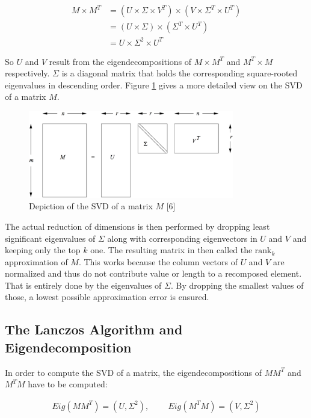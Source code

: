 \begin{align*}
M \times M^T 	& = (U \times \Sigma \times V^T) \times (V \times \Sigma^T \times
U^T) \\
					& = (U \times \Sigma) \times (\Sigma^T \times U^T) \\
					& = U \times \Sigma^2 \times U^T
\end{align*}

So $U$ and $V$ result from the eigendecompositions of $M\times M^T$ and
$M^T\times M$ respectively. $\Sigma$ is a diagonal matrix that holds the
corresponding square-rooted eigenvalues in descending order. Figure
\ref{fig:svd} gives a more detailed view on the SVD of a matrix $M$.

\begin{figure}[h]
	\centering
	\includegraphics[width=0.8\textwidth]{images/svd_mmds.png}
	\caption{Depiction of the SVD of a matrix $M$ [6]}
	\label{fig:svd}
\end{figure}

The actual reduction of dimensions is then performed by dropping least
significant eigenvalues of $\Sigma$ along with corresponding eigenvectors in
$U$ and $V$ and keeping only the top $k$ one. The resulting matrix in then
called the $\text{rank}_k$ approximation of $M$. This works because the column
vectors of $U$ and $V$ are normalized and thus do not contribute value or
length to a recomposed element. That is entirely done by the eigenvalues of
$\Sigma$. By dropping the smallest values of those, a lowest possible
approximation error is ensured.

\subsection{The Lanczos Algorithm and Eigendecomposition}
\label{ssec:lanczos_algorithm}

In order to compute the SVD of a matrix, the eigendecompositions of $MM^T$ and
$M^T M$ have to be computed:

\begin{align*}
	Eig(MM^T) = (U,\Sigma^2), \;	\;\;	\;\;	\;\;\;	Eig(M^T M) = (V,\Sigma^2)
\end{align*}

